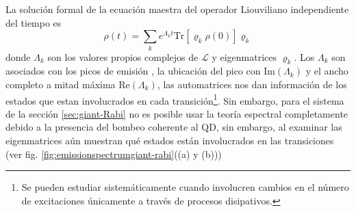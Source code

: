 \documentclass[../main.tex]{subfiles}
\begin{document}
La solución formal de la ecuación maestra del operador Liouviliano independiente del tiempo es
\begin{equation}
	\rho(t) = \sum_k e^{\Lambda_k t} \text{Tr}[\varrho_k \rho(0)] \varrho_k
\end{equation}
donde $\Lambda_k$  son los valores propios complejos de $\mathcal{L}$ y eigenmatrices $\varrho_k$. Los $\Lambda_k$ son asociados con los picos de emisión \parencite{Vargas2018}, la ubicación del pico con $\text{Im}{(\Lambda_k)}$ y el ancho completo a mitad máxima $\text{Re}(\Lambda_k)$, las automatrices nos dan información de los estados que estan involucrados en cada transición\footnote{Se pueden estudiar sistemáticamente cuando involucren cambios en el número de excitaciones únicamente a través de procesos disipativos.}. Sin embargo, para el sistema de la sección \ref{sec:giant-Rabi} no es posible usar la teoría espectral completamente debido a la presencia del bombeo coherente al QD, sin embargo, al examinar las eigenmatrices aún muestran qué estados están involucrados en las transiciones (ver fig. \ref{fig:emissionspectrumgiant-rabi}((a) y (b)))
%
\end{document}
